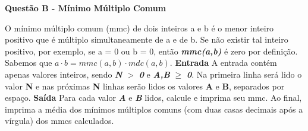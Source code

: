 \documentclass[a4paper, 12pt]{article}
\begin{document}
\newpage %
\begin{center}
\textbf{{\Large Questão B - Mínimo Múltiplo Comum}}
\end{center}
\vspace{5pt}
O mínimo múltiplo comum (mmc) de dois inteiros a e b é o menor inteiro positivo que é múltiplo simultaneamente de a e de b. Se não existir tal inteiro positivo, por exemplo, se a = 0 ou b = 0, então \textit{\textbf{mmc(a,b)}} é zero por definição. Sabemos que $a\cdot b = mmc(a,b) \cdot mdc(a,b)$.
\newline \newline
\textbf{{\large Entrada}} \newline
A entrada contém apenas valores inteiros, sendo \textbf{\textit{N}} $>$ \textbf{\textit{0}} e \textbf{\textit{A,B}} $\geq$ \textbf{\textit{0}}. Na primeira linha será lido o valor \textbf{N} e nas próximas \textbf{N} linhas serão lidos os valores \textbf{A} e \textbf{B}, separados por espaço.
\newline \newline
\textbf{{\large Saída}} \newline
Para cada valor \textbf{\textit{A}} e \textbf{\textit{B}} lidos, calcule e imprima seu mmc. Ao final, imprima a média dos mínimos múltiplos comuns (com duas casas decimais após a vírgula) dos mmcs calculados.
\newline
\end{document}
